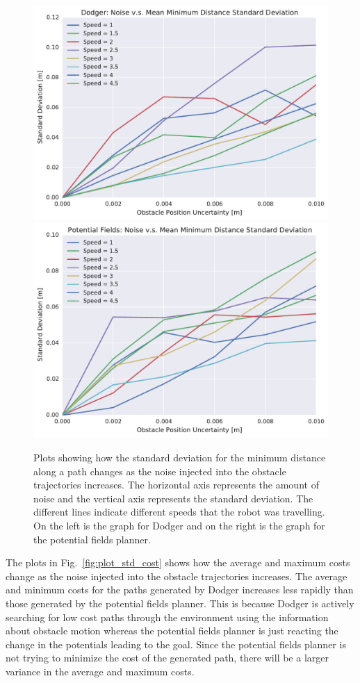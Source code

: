 \begin{figure}[h!]
    \centering
    \includegraphics[width=0.48\linewidth]{figs/planner_std_min_distance_0}
    \includegraphics[width=0.48\linewidth]{figs/pf_std_min_distance_0}

    \caption{Plots showing how the standard deviation for the minimum distance
        along a path changes as the noise injected into the obstacle
        trajectories increases. The horizontal axis represents the amount of
        noise and the vertical axis represents the standard deviation. The
        different lines indicate different speeds that the robot was
    travelling. On the left is the graph for Dodger and on the right is the
graph for the potential fields planner.}

    \label{fig:plot_std_min_distance}
\end{figure}

The plots in Fig.~\ref{fig:plot_std_cost} shows how the average and maximum
costs change as the noise injected into the obstacle trajectories increases.
The average and minimum costs for the paths generated by Dodger increases less
rapidly than those generated by the potential fields planner. This is because
Dodger is actively searching for low cost paths through the environment using
the information about obstacle motion whereas the potential fields planner is
just reacting the change in the potentials leading to the goal. Since the
potential fields planner is not trying to minimize the cost of the generated
path, there will be a larger variance in the average and maximum costs.

